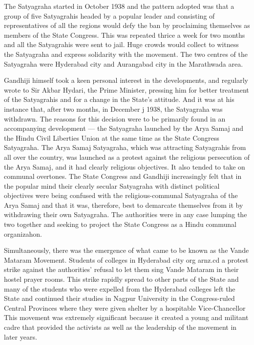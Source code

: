 The Satyagraha started in October 1938 and the pattern adopted was that a group of five Satyagrahis headed by a popular leader and consisting of representatives of all the regions would defy the ban by proclaiming themselves as members of the State Congress. This was repeated thrice a week for two months and all the Satyagrahis were sent to jail. Huge crowds would collect to witness the Satyagraha and express solidarity with the movement. The two centres of the Satyagraha were Hyderabad city and Aurangabad city in the Marathwada area. 

Gandhiji himself took a keen personal interest in the developments, and regularly wrote to Sir Akbar Hydari, the Prime Minister, pressing him for better treatment of the Satyagrahis and for a change in the State’s attitude. And it was at his instance that, after two months, in December j 1938, the Satyagraha was withdrawn. The reasons for this decision were to be primarily found in an accompanying development — the Satyagraha launched by the Arya Samaj and the Hindu Civil Liberties Union at the same time as the State Congress Satyagraha. The Arya Samaj Satyagraha, which was attracting Satyagrahis from all over the country, was launched as a protest against the religious persecution of the Arya Samaj, and it had clearly religious objectives. It also tended to take on communal overtones. The State Congress and Gandhiji increasingly felt that in the popular mind their clearly secular Satyagraha with distinct political objectives were being confused with the religious-communal Satyagraha of the Arya Samaj and that it was, therefore, best to demarcate themselves from it by withdrawing their own Satyagraha. The authorities were in any case lumping the two together and seeking to project the State Congress as a Hindu communal organizahon. 

Simultaneously, there was the emergence of what came to be known as the Vande Mataram Movement. Students of colleges in Hyderabad city org arnz.cd a protest strike against the authorities’ refusal to let them sing Vande Mataram in their hostel prayer rooms. This strike rapidly spread to other parts of the State and many of the students who were expelled from the Hyderabad colleges left the State and continued their studies in Nagpur University in the Congress-ruled Central Provinces where they were given shelter by a hospitable Vice-Chancellor This movement was extremely significant because it created a young and militant cadre that provided the activists as well as the leadership of the movement in later years. 

